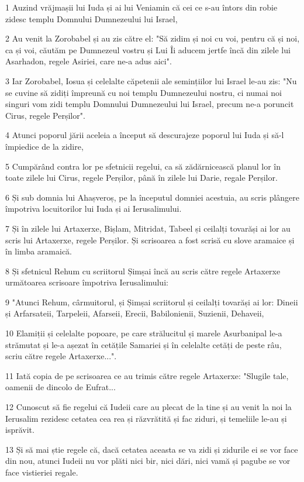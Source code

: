 \par 1 Auzind vrăjmașii lui Iuda și ai lui Veniamin că cei ce s-au întors din robie zidesc templu Domnului Dumnezeului lui Israel,
\par 2 Au venit la Zorobabel și au zis către el: "Să zidim și noi cu voi, pentru că și noi, ca și voi, căutăm pe Dumnezeul vostru și Lui Îi aducem jertfe încă din zilele lui Asarhadon, regele Asiriei, care ne-a adus aici".
\par 3 Iar Zorobabel, Iosua și celelalte căpetenii ale semințiilor lui Israel le-au zis: "Nu se cuvine să zidiți împreună cu noi templu Dumnezeului nostru, ci numai noi singuri vom zidi templu Domnului Dumnezeului lui Israel, precum ne-a poruncit Cirus, regele Perșilor".
\par 4 Atunci poporul jării aceleia a început să descurajeze poporul lui Iuda și să-l împiedice de la zidire,
\par 5 Cumpărând contra lor pe sfetnicii regelui, ca să zădărnicească planul lor în toate zilele lui Cirus, regele Perșilor, până în zilele lui Darie, regale Perșilor.
\par 6 Și sub domnia lui Ahașveroș, pe la începutul domniei acestuia, au scris plângere împotriva locuitorilor lui Iuda și ai Ierusalimului.
\par 7 Și în zilele lui Artaxerxe, Bișlam, Mitridat, Tabeel și ceilalți tovarăși ai lor au scris lui Artaxerxe, regele Perșilor. Și scrisoarea a fost scrisă cu slove aramaice și în limba aramaică.
\par 8 Și sfetnicul Rehum cu scriitorul Șimșai încă au scris către regele Artaxerxe următoarea scrisoare împotriva Ierusalimului:
\par 9 "Atunci Rehum, cârmuitorul, și Șimșai scriitorul și ceilalți tovarăși ai lor: Dineii și Arfarsateii, Tarpeleii, Afarseii, Erecii, Babilonienii, Suzienii, Dehaveii,
\par 10 Elamiții și celelalte popoare, pe care strălucitul și marele Asurbanipal le-a strămutat și le-a așezat în cetățile Samariei și în celelalte cetăți de peste râu, scriu către regele Artaxerxe...".
\par 11 Iată copia de pe scrisoarea ce au trimis către regele Artaxerxe: "Slugile tale, oamenii de dincolo de Eufrat...
\par 12 Cunoscut să fie regelui că Iudeii care au plecat de la tine și au venit la noi la Ierusalim rezidesc cetatea cea rea și răzvrătită și fac ziduri, și temeliile le-au și isprăvit.
\par 13 Și să mai știe regele că, dacă cetatea aceasta se va zidi și zidurile ei se vor face din nou, atunci Iudeii nu vor plăti nici bir, nici dări, nici vamă și pagube se vor face vistieriei regale.
